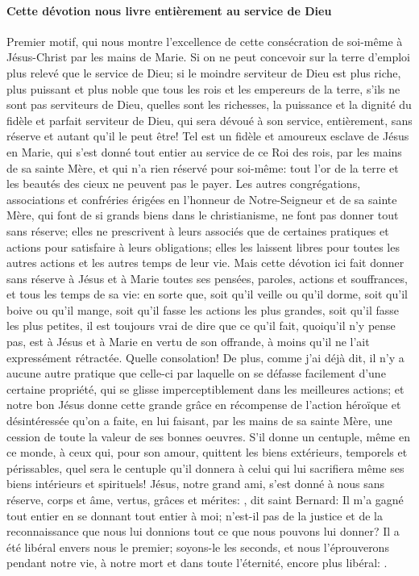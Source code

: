 \paragraph{Cette dévotion nous livre entièrement au service de Dieu}
 Premier motif, qui nous montre l'excellence de cette consécration de soi-même à Jésus-Christ par les mains
de Marie.
Si on ne peut concevoir sur la terre d'emploi plus relevé que le service de Dieu; si le moindre serviteur de Dieu est
plus riche, plus puissant et plus noble que tous les rois et les empereurs de la terre, s'ils ne sont pas serviteurs de
Dieu, quelles sont les richesses, la puissance et la dignité du fidèle et parfait serviteur de Dieu, qui sera dévoué à
son service, entièrement, sans réserve et autant qu'il le peut être! Tel est un fidèle et amoureux esclave de Jésus
en Marie, qui s'est donné tout entier au service de ce Roi des rois, par les mains de sa sainte Mère, et qui n'a rien
réservé pour soi-même: tout l'or de la terre et les beautés des cieux ne peuvent pas le payer.
 Les autres congrégations, associations et confréries érigées en l'honneur de Notre-Seigneur et de sa sainte
Mère, qui font de si grands biens dans le christianisme, ne font pas donner tout sans réserve; elles ne prescrivent
à leurs associés que de certaines pratiques et actions pour satisfaire à leurs obligations; elles les laissent libres
pour toutes les autres actions et les autres temps de leur vie. Mais cette dévotion ici fait donner sans réserve à
Jésus et à Marie toutes ses pensées, paroles, actions et souffrances, et tous les temps de sa vie: en sorte que,
soit qu'il veille ou qu'il dorme, soit qu'il boive ou qu'il mange, soit qu'il fasse les actions les plus grandes, soit qu'il
fasse les plus petites, il est toujours vrai de dire que ce qu'il fait, quoiqu'il n'y pense pas, est à Jésus et à Marie en
vertu de son offrande, à moins qu'il ne l'ait expressément rétractée. Quelle consolation!
 De plus, comme j'ai déjà dit, il n'y a aucune autre pratique que celle-ci par laquelle on se défasse facilement
d'une certaine propriété, qui se glisse imperceptiblement dans les meilleures actions; et notre bon Jésus donne
cette grande grâce en récompense de l'action héroïque et désintéressée qu'on a faite, en lui faisant, par les mains
de sa sainte Mère, une cession de toute la valeur de ses bonnes oeuvres. S'il donne un centuple, même en ce
monde, à ceux qui, pour son amour, quittent les biens extérieurs, temporels et périssables, quel sera le centuple
qu'il donnera à celui qui lui sacrifiera même ses biens intérieurs et spirituels!
 Jésus, notre grand ami, s'est donné à nous sans réserve, corps et âme, vertus, grâces et mérites: , dit saint Bernard: Il m'a gagné tout entier en se donnant tout entier à moi; n'est-il pas de la
justice et de la reconnaissance que nous lui donnions tout ce que nous pouvons lui donner? Il a été libéral envers
nous le premier; soyons-le les seconds, et nous l'éprouverons pendant notre vie, à notre mort et dans toute
l'éternité, encore plus libéral: .

